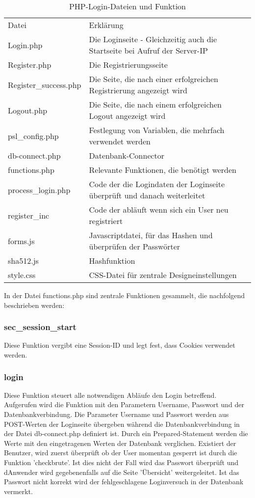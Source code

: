 \begin{table}
\caption{PHP-Login-Dateien und Funktion}
\label{tab:Login-Dateien}
\begin{tabular}{p{} p{}}
Datei & Erklärung \\
Login.php & Die Loginseite - Gleichzeitig auch die Startseite bei Aufruf der
Server-IP\\
Register.php & Die Registrierungsseite \\
Register\_success.php & Die Seite, die nach einer erfolgreichen Registrierung
angezeigt wird \\
Logout.php & Die Seite, die nach einem erfolgreichen Logout angezeigt wird \\
psl\_config.php & Festlegung von Variablen, die mehrfach verwendet werden \\
db-connect.php & Datenbank-Connector \\
functions.php & Relevante Funktionen, die benötigt werden \\
process\_login.php & Code der die Logindaten der Loginseite überprüft und danach
weiterleitet \\
register\_inc & Code der abläuft wenn sich ein User neu registriert \\
forms.js & Javascriptdatei, für das Hashen und überprüfen der Passwörter \\
sha512.js & Hashfunktion \\
style.css & CSS-Datei für zentrale Designeinstellungen \\
 \end{tabular}
\end{table}

In der Datei functions.php sind zentrale Funktionen gesammelt, die nachfolgend
beschrieben werden:

\subsubsection{sec\_session\_start}
Diese Funktion vergibt eine Session-ID und legt fest, dass Cookies verwendet werden.

\subsubsection{login}
Diese Funktion steuert alle notwendigen Abläufe den Login betreffend.\\
Aufgerufen wird die Funktion mit den Parametern Username, Passwort und der Datenbankverbindung. Die Parameter Username und Passwort werden aus POST-Werten der Loginseite übergeben während die Datenbankverbindung in der Datei db-connect.php definiert ist. Durch ein Prepared-Statement werden die Werte mit den eingetragenen Werten der Datenbank verglichen. Existiert der Benutzer, wird zuerst überprüft ob der User momentan gesperrt ist durch die Funktion 'checkbrute'. Ist dies nicht der Fall wird das Passwort überprüft und dAnwender wird gegebenenfalls auf die Seite 'Übersicht' weitergeleitet. Ist das Passwort nicht korrekt wird der fehlgeschlagene Loginversuch in der Datenbank vermerkt.

